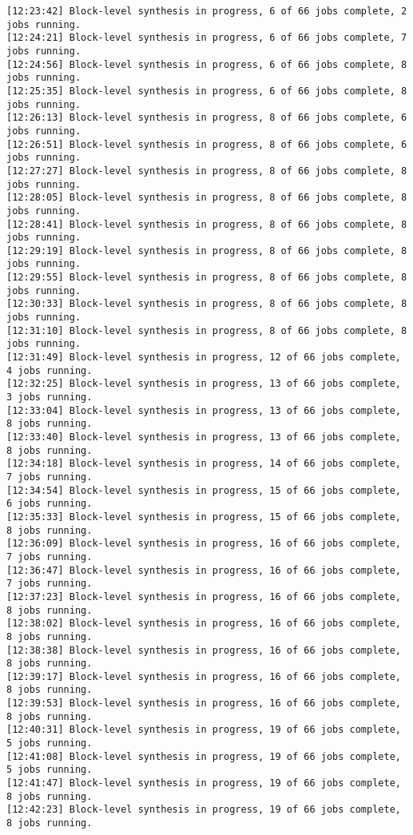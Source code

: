 \begin{lstlisting}[label=lst:lev_rec,caption=Содержимое log-файла]
[12:23:42] Block-level synthesis in progress, 6 of 66 jobs complete, 2 jobs running.
[12:24:21] Block-level synthesis in progress, 6 of 66 jobs complete, 7 jobs running.
[12:24:56] Block-level synthesis in progress, 6 of 66 jobs complete, 8 jobs running.
[12:25:35] Block-level synthesis in progress, 6 of 66 jobs complete, 8 jobs running.
[12:26:13] Block-level synthesis in progress, 8 of 66 jobs complete, 6 jobs running.
[12:26:51] Block-level synthesis in progress, 8 of 66 jobs complete, 6 jobs running.
[12:27:27] Block-level synthesis in progress, 8 of 66 jobs complete, 8 jobs running.
[12:28:05] Block-level synthesis in progress, 8 of 66 jobs complete, 8 jobs running.
[12:28:41] Block-level synthesis in progress, 8 of 66 jobs complete, 8 jobs running.
[12:29:19] Block-level synthesis in progress, 8 of 66 jobs complete, 8 jobs running.
[12:29:55] Block-level synthesis in progress, 8 of 66 jobs complete, 8 jobs running.
[12:30:33] Block-level synthesis in progress, 8 of 66 jobs complete, 8 jobs running.
[12:31:10] Block-level synthesis in progress, 8 of 66 jobs complete, 8 jobs running.
[12:31:49] Block-level synthesis in progress, 12 of 66 jobs complete, 4 jobs running.
[12:32:25] Block-level synthesis in progress, 13 of 66 jobs complete, 3 jobs running.
[12:33:04] Block-level synthesis in progress, 13 of 66 jobs complete, 8 jobs running.
[12:33:40] Block-level synthesis in progress, 13 of 66 jobs complete, 8 jobs running.
[12:34:18] Block-level synthesis in progress, 14 of 66 jobs complete, 7 jobs running.
[12:34:54] Block-level synthesis in progress, 15 of 66 jobs complete, 6 jobs running.
[12:35:33] Block-level synthesis in progress, 15 of 66 jobs complete, 8 jobs running.
[12:36:09] Block-level synthesis in progress, 16 of 66 jobs complete, 7 jobs running.
[12:36:47] Block-level synthesis in progress, 16 of 66 jobs complete, 7 jobs running.
[12:37:23] Block-level synthesis in progress, 16 of 66 jobs complete, 8 jobs running.
[12:38:02] Block-level synthesis in progress, 16 of 66 jobs complete, 8 jobs running.
[12:38:38] Block-level synthesis in progress, 16 of 66 jobs complete, 8 jobs running.
[12:39:17] Block-level synthesis in progress, 16 of 66 jobs complete, 8 jobs running.
[12:39:53] Block-level synthesis in progress, 16 of 66 jobs complete, 8 jobs running.
[12:40:31] Block-level synthesis in progress, 19 of 66 jobs complete, 5 jobs running.
[12:41:08] Block-level synthesis in progress, 19 of 66 jobs complete, 5 jobs running.
[12:41:47] Block-level synthesis in progress, 19 of 66 jobs complete, 8 jobs running.
[12:42:23] Block-level synthesis in progress, 19 of 66 jobs complete, 8 jobs running.

\end{lstlisting}
